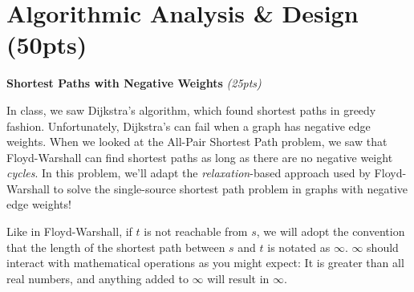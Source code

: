 \documentclass{exam}
\begin{document}
\section{Algorithmic Analysis \& Design (50pts)}
\begin{questions}
    \question \textbf{Shortest Paths with Negative Weights} \textit{(25pts)}

    In class, we saw Dijkstra's algorithm, which found shortest paths in greedy fashion. Unfortunately, Dijkstra's can fail when a graph has negative edge weights. When we looked at the All-Pair Shortest Path problem, we saw that Floyd-Warshall can find shortest paths as long as there are no negative weight \textit{cycles}. In this problem, we'll adapt the \textit{relaxation}-based approach used by Floyd-Warshall to solve the single-source shortest path problem in graphs with negative edge weights!

    Like in Floyd-Warshall, if $t$ is not reachable from $s$, we will adopt the convention that the length of the shortest path between $s$ and $t$ is notated as $\infty$. $\infty$ should interact with mathematical operations as you might expect: It is greater than all real numbers, and anything added to $\infty$ will result in $\infty$.
\end{questions}
\end{document}
